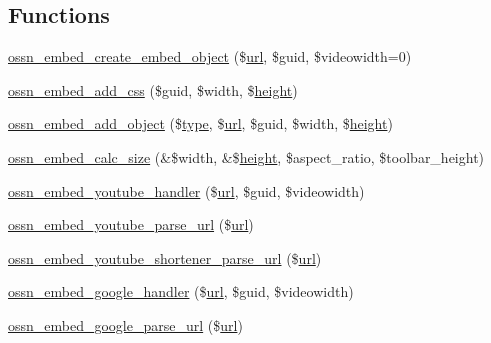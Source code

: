 \subsection*{Functions}
\begin{DoxyCompactItemize}
\item 
\hyperlink{ossnembed_8lib_8php_a36c24a9d71aafb8345070b9c9fb1c002}{ossn\+\_\+embed\+\_\+create\+\_\+embed\+\_\+object} (\$\hyperlink{ossn_8config_8site_8example_8php_ad643c3db2725019ef8130393d549e6db}{url}, \$guid, \$videowidth=0)
\item 
\hyperlink{ossnembed_8lib_8php_aafb7ccd901ee68c6a9b48848b408c59c}{ossn\+\_\+embed\+\_\+add\+\_\+css} (\$guid, \$width, \$\hyperlink{jquery-ui_8min_8js_a7ec7f4e8243c6c20295ecc9a90225d43}{height})
\item 
\hyperlink{ossnembed_8lib_8php_a9e7dd45ebdf9d347842b56a435f0ae4a}{ossn\+\_\+embed\+\_\+add\+\_\+object} (\$\hyperlink{_ossn_wall_2actions_2wall_2post_2group_8php_a2dc1bb4e1ed0029daa81ac0776b14b51}{type}, \$\hyperlink{ossn_8config_8site_8example_8php_ad643c3db2725019ef8130393d549e6db}{url}, \$guid, \$width, \$\hyperlink{jquery-ui_8min_8js_a7ec7f4e8243c6c20295ecc9a90225d43}{height})
\item 
\hyperlink{ossnembed_8lib_8php_a072573c7e0a7a038f40ca401e053f7d2}{ossn\+\_\+embed\+\_\+calc\+\_\+size} (\&\$width, \&\$\hyperlink{jquery-ui_8min_8js_a7ec7f4e8243c6c20295ecc9a90225d43}{height}, \$aspect\+\_\+ratio, \$toolbar\+\_\+height)
\item 
\hyperlink{ossnembed_8lib_8php_a82786a653f81e2d634f0127bc0982de3}{ossn\+\_\+embed\+\_\+youtube\+\_\+handler} (\$\hyperlink{ossn_8config_8site_8example_8php_ad643c3db2725019ef8130393d549e6db}{url}, \$guid, \$videowidth)
\item 
\hyperlink{ossnembed_8lib_8php_a54fa642d2ba10636296504a4e3508b8a}{ossn\+\_\+embed\+\_\+youtube\+\_\+parse\+\_\+url} (\$\hyperlink{ossn_8config_8site_8example_8php_ad643c3db2725019ef8130393d549e6db}{url})
\item 
\hyperlink{ossnembed_8lib_8php_ac37023ac5fde4bce694c4fdd26613ad8}{ossn\+\_\+embed\+\_\+youtube\+\_\+shortener\+\_\+parse\+\_\+url} (\$\hyperlink{ossn_8config_8site_8example_8php_ad643c3db2725019ef8130393d549e6db}{url})
\item 
\hyperlink{ossnembed_8lib_8php_af43b653fcdc68529596edeab0a23e583}{ossn\+\_\+embed\+\_\+google\+\_\+handler} (\$\hyperlink{ossn_8config_8site_8example_8php_ad643c3db2725019ef8130393d549e6db}{url}, \$guid, \$videowidth)
\item 
\hyperlink{ossnembed_8lib_8php_ad699a4cc71f6abb5da6acd5c4363c886}{ossn\+\_\+embed\+\_\+google\+\_\+parse\+\_\+url} (\$\hyperlink{ossn_8config_8site_8example_8php_ad643c3db2725019ef8130393d549e6db}{url})

\end{DoxyCompactItemize}
